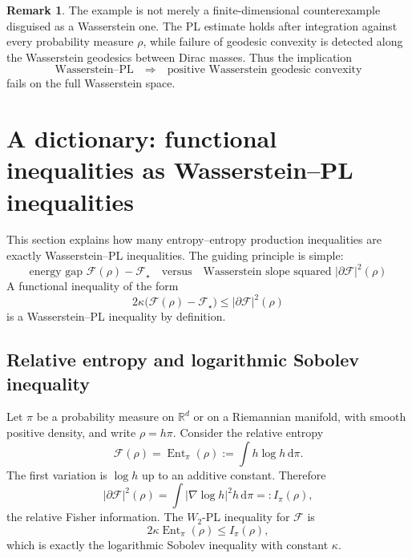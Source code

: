 \documentclass[11pt]{article}
\theoremstyle{definition}
\newtheorem{remark}[theorem]{Remark}
\DeclareMathOperator{\Ent}{Ent}
\newcommand{\F}{\mathcal F}
\newcommand{\W}{W_2}
\newcommand{\R}{\mathbb R}
\newcommand{\dd}{\,\mathrm d}
\begin{document}
\begin{remark}
The example is not merely a finite-dimensional counterexample disguised as a Wasserstein one. The PL estimate holds after integration against every probability measure $\rho$, while failure of geodesic convexity is detected along the Wasserstein geodesics between Dirac masses. Thus the implication
\[
        \text{Wasserstein--PL} \quad\Longrightarrow\quad
        \text{positive Wasserstein geodesic convexity}
\]
fails on the full Wasserstein space.
\end{remark}

\section{A dictionary: functional inequalities as Wasserstein--PL inequalities}

This section explains how many entropy--entropy production inequalities are exactly Wasserstein--PL inequalities. The guiding principle is simple:
\[
        \boxed{
        \text{energy gap }\F(\rho)-\F_\star
        \quad\text{versus}\quad
        \text{Wasserstein slope squared }|\partial\F|^2(\rho)
        }
\]
A functional inequality of the form
\[
        2\kappa\bigl(\F(\rho)-\F_\star\bigr)
        \le |\partial\F|^2(\rho)
\]
is a Wasserstein--PL inequality by definition.

\subsection{Relative entropy and logarithmic Sobolev inequality}

Let $\pi$ be a probability measure on $\R^d$ or on a Riemannian manifold, with smooth positive density, and write $\rho=h\pi$. Consider the relative entropy
\begin{equation}
        \F(\rho)=\Ent_\pi(\rho)
        :=\int h\log h\dd\pi.
        \label{eq:relative-entropy}
\end{equation}
The first variation is $\log h$ up to an additive constant. Therefore
\begin{equation}
        |\partial\F|^2(\rho)
        =\int |\nabla\log h|^2 h\dd\pi
        =: I_\pi(\rho),
        \label{eq:fisher-information}
\end{equation}
the relative Fisher information. The $\W$-PL inequality for $\F$ is
\begin{equation}
        2\kappa\Ent_\pi(\rho)
        \le I_\pi(\rho),
        \label{eq:lsi-as-pl}
\end{equation}
which is exactly the logarithmic Sobolev inequality with constant $\kappa$.
\end{document}
